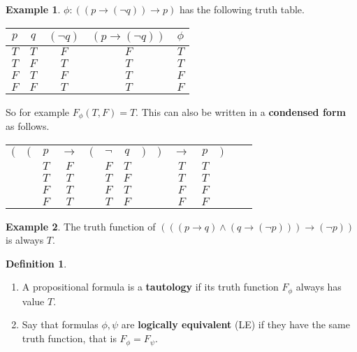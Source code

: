 \documentclass{article}
\newcommand{\rb}[1]{\left( #1 \right)}
\newcommand{\notb}[1]{\rb{\neg #1}}
\newcommand{\andb}[2]{\rb{#1 \land #2}}
\newcommand{\impb}[2]{\rb{#1 \rightarrow #2}}
\theoremstyle{definition}\newtheorem{definition}{Definition}[subsection]
\theoremstyle{definition}\newtheorem{remark}[definition]{Remark}
\theoremstyle{definition}\newtheorem*{example}{Example}
\theoremstyle{definition}\newtheorem*{note}{Note}
\begin{document}
\begin{example}
$ \phi : \impb{\impb{p}{\notb{q}}}{p} $ has the following truth table.
\begin{center}
\begin{tabular}{|c|c|c|c|c|}
\hline
$ p $ & $ q $ & $ \notb{q} $ & $ \impb{p}{\notb{q}} $ & $ \phi $ \\
\hline
$ T $ & $ T $ & $ F $ & $ F $ & $ T $ \\
\hline
$ T $ & $ F $ & $ T $ & $ T $ & $ T $ \\
\hline
$ F $ & $ T $ & $ F $ & $ T $ & $ F $ \\
\hline
$ F $ & $ F $ & $ T $ & $ T $ & $ F $ \\
\hline
\end{tabular}
\end{center}
So for example $ F_\phi\rb{T, F} = T $. This can also be written in a \textbf{condensed form} as follows.
\begin{center}
\begin{tabular}{c c c c c c c c c c c c c c}
$ ( $ & $ ( $ & $ p $ & $ \rightarrow $ & $ ( $ & $ \neg $ & $ q $ & $ ) $ & $ ) $ & $ \rightarrow $ & $ p $ & $ ) $ \\
& & $ T $ & $ F $ & & $ F $ & $ T $ & & & $ T $ & $ T $ & \\
& & $ T $ & $ T $ & & $ T $ & $ F $ & & & $ T $ & $ T $ & \\
& & $ F $ & $ T $ & & $ F $ & $ T $ & & & $ F $ & $ F $ & \\
& & $ F $ & $ T $ & & $ T $ & $ F $ & & & $ F $ & $ F $ & \\
\end{tabular}
\end{center}
\end{example}


\begin{example}
The truth function of $ \impb{\andb{\impb{p}{q}}{\impb{q}{\notb{p}}}}{\notb{p}} $ is always $ T $.
\end{example}

\begin{definition}
\hfill
\begin{enumerate}
\item A propositional formula is a \textbf{tautology} if its truth function $ F_\phi $ always has value $ T $.
\item Say that formulas $ \phi, \psi $ are \textbf{logically equivalent} (LE) if they have the same truth function, that is $ F_\phi = F_\psi $.
\end{enumerate}
\end{definition}
\end{document}
